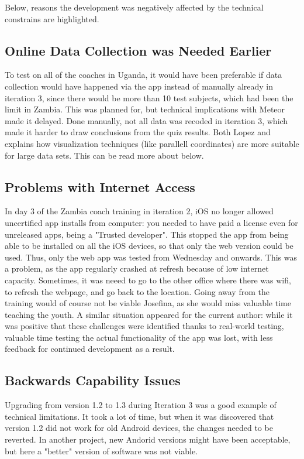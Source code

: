 Below, reasons the development was negatively affected by the technical constrains are highlighted.

\subsection{Online Data Collection was Needed Earlier}
To test on all of the coaches in Uganda, it would have been preferable if data collection would have happened via the app instead of manually already in iteration 3, since there would be more than 10 test subjects, which had been the limit in Zambia. This was planned for, but technical implications with Meteor made it delayed. Done manually, not all data was recoded in iteration 3, which made it harder to draw conclusions from the quiz results. Both Lopez \cite{une-terre} and \cite{timo-ropinski-liu} explains how visualization techniques (like parallell coordinates) are more suitable for large data sets. This can be read more about below.

\subsection{Problems with Internet Access}
In day 3 of the Zambia coach training in iteration 2, iOS no longer allowed uncertified app installs from computer: you needed to have paid a license even for unreleased apps, being a "Trusted developer". This stopped the app from being able to be installed on all the iOS devices, so that only the web version could be used. Thus, only the web app was tested from Wednesday and onwards. This was a problem, as the app regularly crashed at refresh because of low internet capacity. Sometimes, it was neeed to go to the other office where there was wifi, to refresh the webpage, and go back to the location. Going away from the training would of course not be viable Josefina, as she would miss valuable time teaching the youth. A similar situation appeared for the current author: while it was positive that these challenges were identified thanks to real-world testing, valuable time testing the actual functionality of the app was lost, with less feedback for continued development as a result.

\subsection{Backwards Capability Issues} \label{backwards-capability}
Upgrading from version 1.2 to 1.3 during Iteration 3 was a good example of technical limitations. It took a lot of time, but when it was discovered that version 1.2 did not work for old Android devices, the changes needed to be reverted. In another project, new Andorid versions might have been acceptable, but here a "better" version of software was not viable.

